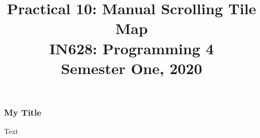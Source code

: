 \documentclass[10pt]{beamer}
\author{}
\title{Practical 10: Manual Scrolling Tile Map\\IN628: Programming 4\\Semester One, 2020}
\institute{Otago Polytechnic, Dunedin, New Zealand}
\date{}
\begin{document}
\begin{frame}
	\titlepage
\end{frame}

\begin{frame}
	\frametitle{My Title} 
	Text
\end{frame}
  
\end{document}

